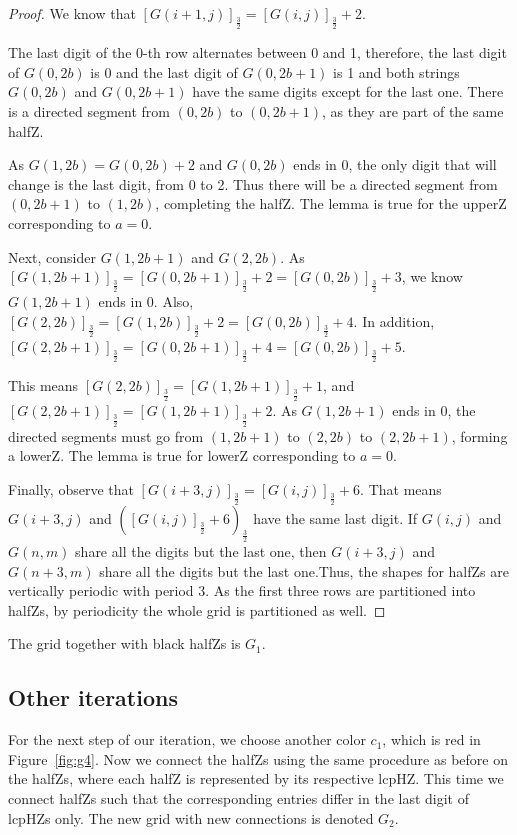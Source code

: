 \documentclass[12pt,reqno]{article}
\theoremstyle{plain}
\theoremstyle{definition}
\theoremstyle{remark}
\begin{document}
\begin{proof}
We know that $[G(i+1,j)]_\frac{3}{2} = [G(i,j)]_\frac{3}{2} + 2$.

The last digit of the 0-th row alternates between 0 and 1, therefore, the last digit of $G(0,2b)$ is 0 and the last digit of $G(0,2b+1)$ is 1 and both strings $G(0,2b)$ and $G(0,2b+1)$ have the same digits except for the last one. There is a directed segment from $(0,2b)$ to $(0,2b+1)$, as they are part of the same halfZ. 

As $G(1,2b) = G(0,2b) + 2$ and $G(0,2b)$ ends in 0, the only digit that will change is the last digit, from 0 to 2. Thus there will be a directed segment from $(0,2b+1)$ to $(1,2b)$, completing the halfZ. The lemma is true for the upperZ corresponding to $a=0$.

Next, consider $G(1,2b+1)$ and $G(2,2b)$. As $[G(1,2b+1)]_{\frac{3}{2}} = [G(0,2b+1)]_{\frac{3}{2}} + 2 = [G(0,2b)]_{\frac{3}{2}} +3$, we know $G(1,2b+1)$ ends in 0. Also,  $[G(2,2b)]_{\frac{3}{2}} = [G(1,2b)]_{\frac{3}{2}} + 2 = [G(0,2b)]_{\frac{3}{2}} + 4$. In addition, $[G(2,2b+1)]_{\frac{3}{2}} = [G(0,2b+1)]_{\frac{3}{2}} + 4 = [G(0,2b)]_{\frac{3}{2}} + 5$.

This means $[G(2,2b)]_{\frac{3}{2}} = [G(1,2b+1)]_{\frac{3}{2}}+1$, and $[G(2,2b+1)]_{\frac{3}{2}} = [G(1,2b+1)]_{\frac{3}{2}}+2$. As $G(1,2b+1)$ ends in 0, the directed segments must go from $(1,2b+1)$ to $(2,2b)$ to $(2,2b+1)$, forming a lowerZ. The lemma is true for lowerZ corresponding to $a=0$.


Finally, observe that $[G(i+3,j)]_{\frac{3}{2}} = [G(i,j)]_{\frac{3}{2}}+6$. That means $G(i+3,j)$ and $([G(i,j)]_{\frac{3}{2}}+6)_{\frac{3}{2}}$ have the same last digit. If $G(i,j)$ and $G(n,m)$ share all the digits but the last one, then $G(i+3,j)$ and $G(n+3,m)$ share all the digits but the last one.Thus, the shapes for halfZs are vertically periodic with period 3. As the first three rows are partitioned into halfZs, by periodicity the whole grid is partitioned as well.
\end{proof}

The grid together with black halfZs is $G_1$. 

\subsection{Other iterations}

For the next step of our iteration, we choose another color $c_1$, which is red in Figure~\ref{fig:g4}. Now we connect the halfZs using the same procedure as before on the halfZs, where each halfZ is represented by its respective lcpHZ. This time we connect halfZs such that the corresponding entries differ in the last digit of lcpHZs only. The new grid with new connections is denoted $G_2$. 
\end{document}
